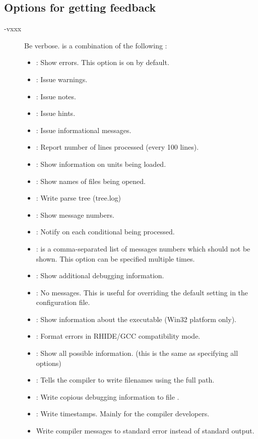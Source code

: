 %
%
\subsection{Options for getting feedback}
\label{se:feedbackoptions}
\begin{description}
\item[-vxxx] Be verbose.  is a combination of the following :
\begin{itemize}
\item {} : Show errors. This option is on by default.
\item {} : Issue warnings.
\item {} : Issue notes.
\item {} : Issue hints.
\item {} : Issue informational messages.
\item {} : Report number of lines processed (every 100 lines).
\item {} : Show information on units being loaded.
\item {} : Show names of files being opened.
\item {} : Write parse tree (tree.log)
\item {} : Show message numbers.
\item {} : Notify on each conditional being processed.
\item {} :  is a comma-separated list of messages numbers which should not be shown.
This option can be specified multiple times.
\item {} : Show additional debugging information.
\item {} : No messages. This is useful for overriding the default setting in the configuration file.
\item {} : Show information about the executable (Win32 platform only).
\item {} : Format errors in RHIDE/GCC compatibility mode.
\item {} : Show all possible information. (this is the same as specifying all options)
\item {} : Tells the compiler to write filenames using the full path.
\item {} : Write copious debugging information to file .
\item {} : Write timestamps. Mainly for the compiler developers.
\item {} Write compiler messages to standard error instead of standard output.
\end{itemize}

\end{description}

